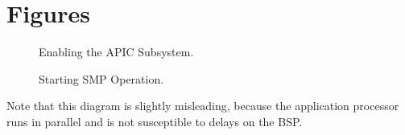 \chapter{Figures}
\label{ch:figures}

\begin{figure}[h]
    \centering
    \begin{subfigure}[b]{0.85\textwidth}
        
    \end{subfigure}
    \caption{Enabling the APIC Subsystem.}
    \label{fig:apicenable}
\end{figure}

\begin{figure}[h]
    \centering
    \begin{subfigure}[b]{0.85\textwidth}
        
    \end{subfigure}
    \caption{Starting SMP Operation.}
    \label{fig:smpenable}
\end{figure}

Note that this diagram is slightly misleading, because the application processor runs in parallel and is not susceptible to delays on the BSP\@.

\cleardoublepage